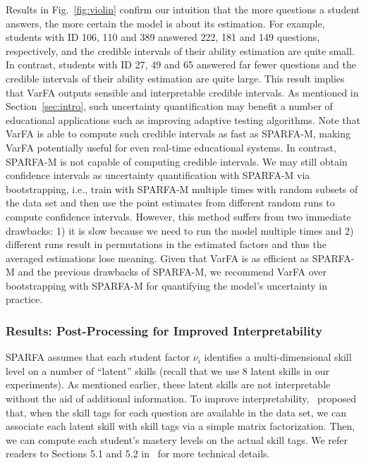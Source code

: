 Results in Fig.~\ref{fig:violin} confirm our intuition that the more questions
a student answers, the more certain the model is about its estimation. For
example, students with ID 106, 110 and 389 answered 222, 181 and 149 questions,
respectively, and the credible intervals of their ability estimation are quite
small. In contrast, students with ID 27, 49 and 65 answered far fewer questions
and the credible intervals of their ability estimation are quite large. This
result implies that VarFA outputs sensible and interpretable credible
intervals. As mentioned in Section~\ref{sec:intro}, such uncertainty
quantification may benefit a number of educational applications such as
improving adaptive testing algorithms.
%
Note that VarFA is able to compute such credible intervals as fast as SPARFA-M,
making VarFA potentially useful for even real-time educational systems. In
contrast, SPARFA-M is not capable of computing credible intervals. We
may still obtain confidence intervals as uncertainty quantification with
SPARFA-M via bootstrapping, i.e., train with SPARFA-M multiple times with
random subsets of the data set and then use the point estimates from different
random runs to compute confidence intervals. However, this method suffers from
two immediate drawbacks: 1) it is slow because we need to run the model
multiple times and 2) different runs result in permutations in the estimated
factors and thus the averaged estimations lose meaning. Given that VarFA is as
efficient as SPARFA-M and the previous drawbacks of SPARFA-M, we recommend
VarFA over bootstrapping with SPARFA-M for quantifying the model's uncertainty in
practice.

\subsubsection{Results: Post-Processing for Improved Interpretability}
\label{sec:experiment-post-processing}
SPARFA assumes that each student factor $\nu_i$ identifies a multi-dimensional skill level on a number of ``latent'' skills (recall that we use 8 latent skills in our experiments). As mentioned earlier, these latent skills are not interpretable without the aid of additional information. To improve interpretability,~\cite{lan14a} proposed that, when the skill tags for each question are available in the data set, we can associate each latent skill with skill tags via a simple matrix factorization. Then, we can compute each student's mastery levels on the actual skill tags. We refer readers to Sections 5.1 and 5.2 in~\cite{lan14a} for more technical details.

